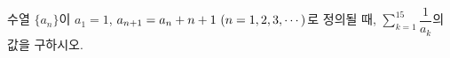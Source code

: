 \hspace*{2mm}\begin{minipage}[t]{\dimexpr\linewidth-2mm\relax}\vspace{0pt}
수열 $\{a_n\}$이 $a_1=1$, $a_{n+1}=a_n+n+1\ (n=1{,}\mkern3mu\mathopen{}2{,}\mkern3mu\mathopen{}3{,}\mkern3mu\mathopen{}\cdots)$로 정의될 때, $\displaystyle\sum_{k=1}^{15}\dfrac{1}{a_k}$의 값을 구하시오.\end{minipage}
